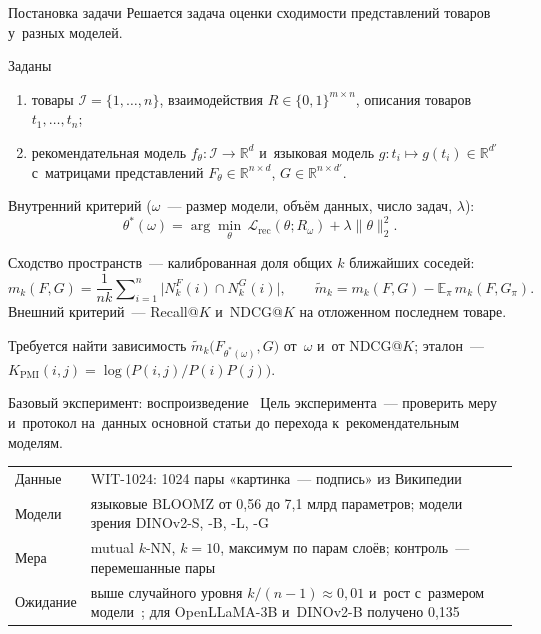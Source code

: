 \documentclass[t,aspectratio=169,11pt,hyperref={unicode}]{beamer}
\begin{document}
\begin{frame}{Постановка задачи}
\small
\setlength{\abovedisplayskip}{3pt}\setlength{\belowdisplayskip}{3pt}
Решается задача оценки сходимости представлений товаров у~разных моделей.

\smallskip
Заданы
\begin{enumerate}
  \item товары $\mathcal{I}=\{1,\dots,n\}$, взаимодействия $R\in\{0,1\}^{m\times n}$,
    описания товаров $t_1,\dots,t_n$;
  \item рекомендательная модель $f_\theta\colon\mathcal{I}\to\mathbb{R}^{d}$ и~языковая
    модель $g\colon t_i\mapsto g(t_i)\in\mathbb{R}^{d'}$ с~матрицами представлений
    $F_\theta\in\mathbb{R}^{n\times d}$, $G\in\mathbb{R}^{n\times d'}$.
\end{enumerate}

\smallskip
Внутренний критерий ($\omega$~--- размер модели, объём данных, число задач, $\lambda$):
\[
  \theta^{*}(\omega)=\arg\min_{\theta}\,\mathcal{L}_{\mathrm{rec}}(\theta;R_\omega)
  +\lambda\|\theta\|_2^2.
\]

\smallskip
Сходство пространств~--- калиброванная доля общих $k$ ближайших соседей:
\[
  m_k(F,G)=\frac{1}{nk}\sum\nolimits_{i=1}^{n}\bigl|N_k^F(i)\cap N_k^G(i)\bigr|,\qquad
  \tilde m_k=m_k(F,G)-\mathbb{E}_{\pi}\,m_k(F,G_{\pi}).
\]
Внешний критерий~--- Recall@$K$ и~NDCG@$K$ на отложенном последнем товаре.

\smallskip
Требуется найти зависимость $\tilde m_k\bigl(F_{\theta^{*}(\omega)},G\bigr)$ от~$\omega$
и~от NDCG@$K$; эталон~--- $K_{\mathrm{PMI}}(i,j)=\log\bigl(P(i,j)/P(i)P(j)\bigr)$.
\end{frame}

\begin{frame}{Базовый эксперимент: воспроизведение~\cite{huh2024platonic}}
Цель эксперимента~--- проверить меру и~протокол на~данных основной статьи
до перехода к~рекомендательным моделям.

\medskip
\small
\renewcommand{\arraystretch}{1.3}
\begin{tabularx}{\textwidth}{@{}p{}L@{}}
\toprule
Данные & WIT-1024: 1024 пары «картинка~--- подпись» из Википедии~\cite{huh2024platonic} \\
Модели & языковые BLOOMZ от 0,56 до 7,1 млрд параметров; модели зрения DINOv2-S, -B, -L, -G \\
Мера & mutual $k$-NN, $k=10$, максимум по парам слоёв; контроль~--- перемешанные пары \\
Ожидание & выше случайного уровня $k/(n-1)\approx0{,}01$ и~рост с~размером
  модели~\cite{huh2024platonic}; для OpenLLaMA-3B и~DINOv2-B получено
  0,135~\cite{koepke2026cave} \\
\bottomrule
\end{tabularx}
\end{frame}
\end{document}
